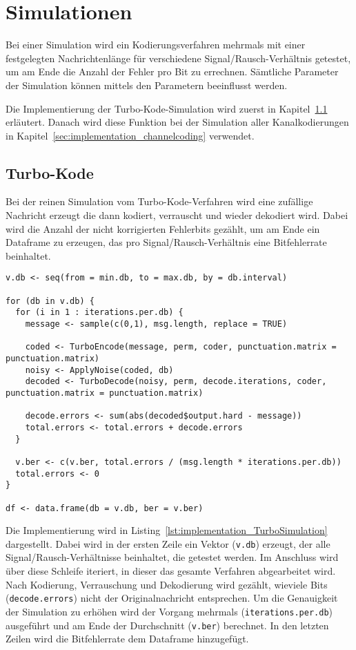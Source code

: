 \FloatBarrier
\section{Simulationen}
\label{sec:implementation_simulation}
Bei einer Simulation wird ein Kodierungsverfahren mehrmals mit einer festgelegten Nachrichtenlänge für verschiedene Signal/Rausch-Verhältnis getestet, um am Ende die Anzahl der Fehler pro Bit zu errechnen. Sämtliche Parameter der Simulation können mittels den Parametern beeinflusst werden.

Die Implementierung der Turbo-Kode-Simulation wird zuerst in Kapitel~\ref{sec:implementation_turbo} erläutert. Danach wird diese Funktion bei der Simulation aller Kanalkodierungen in Kapitel~\ref{sec:implementation_channelcoding} verwendet.

\subsection{Turbo-Kode}
\label{sec:implementation_turbo}
Bei der reinen Simulation vom Turbo-Kode-Verfahren wird eine zufällige Nachricht erzeugt die dann kodiert, verrauscht und wieder dekodiert wird. Dabei wird die Anzahl der nicht korrigierten Fehlerbits gezählt, um am Ende ein Dataframe zu erzeugen, das pro Signal/Rausch-Verhältnis eine Bitfehlerrate beinhaltet.

\begin{lstlisting}[caption=Implementierung von \texttt{TurboSimulation}, label={lst:implementation_TurboSimulation}, float=!th]
v.db <- seq(from = min.db, to = max.db, by = db.interval)

for (db in v.db) {
  for (i in 1 : iterations.per.db) {
    message <- sample(c(0,1), msg.length, replace = TRUE)
    
    coded <- TurboEncode(message, perm, coder, punctuation.matrix = punctuation.matrix)
    noisy <- ApplyNoise(coded, db)
    decoded <- TurboDecode(noisy, perm, decode.iterations, coder, punctuation.matrix = punctuation.matrix)
                             
    decode.errors <- sum(abs(decoded$output.hard - message))
    total.errors <- total.errors + decode.errors
  }

  v.ber <- c(v.ber, total.errors / (msg.length * iterations.per.db))
  total.errors <- 0
}

df <- data.frame(db = v.db, ber = v.ber)
\end{lstlisting}

Die Implementierung wird in Listing~\ref{lst:implementation_TurboSimulation} dargestellt. Dabei wird in der ersten Zeile ein Vektor (\texttt{v.db}) erzeugt, der alle Signal/Rausch-Verhältnisse beinhaltet, die getestet werden. Im Anschluss wird über diese Schleife iteriert, in dieser das gesamte Verfahren abgearbeitet wird. Nach Kodierung, Verrauschung und Dekodierung wird gezählt, wieviele Bits (\texttt{decode.errors}) nicht der Originalnachricht entsprechen. Um die Genauigkeit der Simulation zu erhöhen wird der Vorgang mehrmals (\texttt{iterations.per.db}) ausgeführt und am Ende der Durchschnitt (\texttt{v.ber}) berechnet. In den letzten Zeilen wird die Bitfehlerrate dem Dataframe hinzugefügt.

